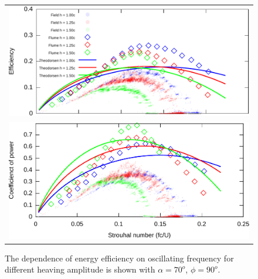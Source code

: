 \begin{figure}
\begin{center}
\begin{tabular}{c}
\includegraphics[width=14cm]{./Figures/Strouhal_vs_Efficiency.pdf} \\
\includegraphics[width=14.5cm]{./Figures/Strouhal_vs_Cp.pdf}
\end{tabular}
\end{center}
\caption[The optimal energy efficient for different stroke frequencies]{The dependence of energy efficiency on oscillating frequency for different heaving amplitude is shown with $\alpha = 70^o$, $\phi = 90^o$. }
\label{fig:Strouhal}
\end{figure}

 